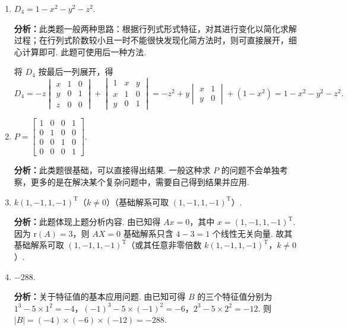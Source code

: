 \documentclass[a4paper,11pt]{ctexart}
\newcommand{\rk}{\mathrm{r}}
\newcommand{\T}{\mathrm{T}}
\begin{document}
\begin{enumerate}[label=\arabic*., leftmargin=2em, itemsep=0.8em, topsep=0.5em]
  \item $D_4 = 1 - x^2 - y^2 - z^2$.

  \textbf{分析：}此类题一般两种思路：根据行列式形式特征，对其进行变化以简化求解过程；在行列式阶数较小且一时不能很快发现化简方法时，则可直接展开，细心计算即可. 此题可使用后一种方法.

  将 $D_4$ 按最后一列展开，得
  \[
    D_4 = -z \begin{vmatrix} x & 1 & 0 \\ y & 0 & 1 \\ z & 0 & 0 \end{vmatrix}
        + \begin{vmatrix} 1 & x & y \\ x & 1 & 0 \\ y & 0 & 1 \end{vmatrix}
        = -z^2 + y \begin{vmatrix} x & 1 \\ y & 0 \end{vmatrix} + (1 - x^2)
        = 1 - x^2 - y^2 - z^2.
  \]

  \item $P = \begin{bmatrix} 1 & 0 & 0 & 1 \\ 0 & 1 & 0 & 0 \\ 0 & 0 & 1 & 0 \\ 0 & 0 & 0 & 1 \end{bmatrix}$.

  \textbf{分析：}此类题很基础，可以直接得出结果. 一般这种求 $P$ 的问题不会单独考察，更多的是在解决某个复杂问题中，需要自己得到结果并应用.

  \item $k(1, -1, 1, -1)^{\T}$（$k \neq 0$）（基础解系可取 $(1, -1, 1, -1)^{\T}$）.

  \textbf{分析：}此题体现上题分析内容. 由已知得 $Ax = 0$，其中 $x = (1, -1, 1, -1)^{\T}$. 因为 $\rk(A) = 3$，则 $AX = 0$ 基础解系只含 $4 - 3 = 1$ 个线性无关向量. 故其基础解系可取 $(1, -1, 1, -1)^{\T}$（或其任意非零倍数 $k(1, -1, 1, -1)^{\T}$，$k \neq 0$）.

  \item $-288$.

  \textbf{分析：}关于特征值的基本应用问题. 由已知可得 $B$ 的三个特征值分别为 $1^3 - 5 \times 1^2 = -4$，$(-1)^3 - 5 \times (-1)^2 = -6$，$2^3 - 5 \times 2^2 = -12$. 则 $|B| = (-4) \times (-6) \times (-12) = -288$.


\end{enumerate}
\end{document}
